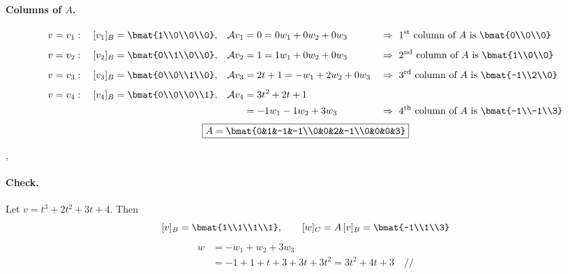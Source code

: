 \begin{example}
\paragraph{Columns of $A$.}
\begin{align*}
v=v_1:\quad [v_1]_B&=\bmat{1\\0\\0\\0}, & \mathcal{A}v_1&=0=0w_1+0w_2+0w_3 &&\Rightarrow\ 1^{\text{st}} \text{ column of } A \text{ is } \bmat{0\\0\\0}\\[4pt]
v=v_2:\quad [v_2]_B&=\bmat{0\\1\\0\\0}, & \mathcal{A}v_2&=1=1w_1+0w_2+0w_3 &&\Rightarrow\ 2^{\text{nd}} \text{ column of } A \text{ is } \bmat{1\\0\\0}\\[4pt]
v=v_3:\quad [v_3]_B&=\bmat{0\\0\\1\\0}, & \mathcal{A}v_3&=2t+1=-w_1+2w_2+0w_3 &&\Rightarrow\ 3^{\text{rd}} \text{ column of } A \text{ is } \bmat{-1\\2\\0}\\[4pt]
v=v_4:\quad [v_4]_B&=\bmat{0\\0\\0\\1}, & \mathcal{A}v_4&=3t^2+2t+1 &&\\*
&& &=-1w_1-1w_2+3w_3 &&\Rightarrow\ 4^{\text{th}} \text{ column of } A \text{ is } \bmat{-1\\-1\\3}
\end{align*}
\[
\boxed{A=\bmat{0&1&-1&-1\\0&0&2&-1\\0&0&0&3}}
\]

\sep
%
\paragraph{Check.} Let $v=t^3+2t^2+3t+4$. Then
\[
[v]_B=\bmat{1\\1\\1\\1}, \qquad [w]_C=A\,[v]_B=\bmat{-1\\1\\3}
\]
\begin{align*}
w&=-w_1+w_2+3w_3\\
&=-1+1+t+3+3t+3t^2=3t^2+4t+3 \quad /\!/
\end{align*}
\end{example}

